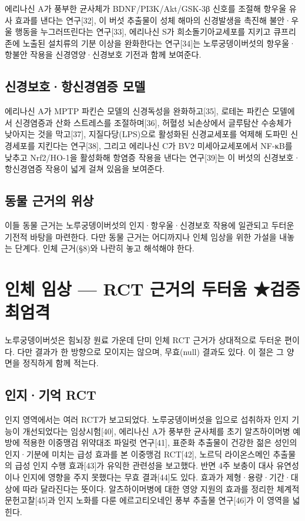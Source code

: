 \documentclass[12pt,oneside]{book}
\begin{document}
에리나신 A가 풍부한 균사체가 BDNF/PI3K/Akt/GSK-3β 신호를 조절해 항우울 유사 효과를 낸다는 연구[32], 이 버섯 추출물이 성체 해마의 신경발생을 촉진해 불안·우울 행동을 누그러뜨린다는 연구[33], 에리나신 S가 희소돌기아교세포를 지키고 큐프리존에 노출된 설치류의 기분 이상을 완화한다는 연구[34]는 노루궁뎅이버섯의 항우울·항불안 작용을 신경영양·신경보호 기전과 함께 보여준다.

\subsection{신경보호·항신경염증 모델}

에리나신 A가 MPTP 파킨슨 모델의 신경독성을 완화하고[35], 로테논 파킨슨 모델에서 신경염증과 산화 스트레스를 조절하며[36], 허혈성 뇌손상에서 글루탐산 수송체가 낮아지는 것을 막고[37], 지질다당(LPS)으로 활성화된 신경교세포를 억제해 도파민 신경세포를 지킨다는 연구[38], 그리고 에리나신 C가 BV2 미세아교세포에서 NF-κB를 낮추고 Nrf2/HO-1을 활성화해 항염증 작용을 낸다는 연구[39]는 이 버섯의 신경보호·항신경염증 작용이 넓게 걸쳐 있음을 보여준다.

\subsection{동물 근거의 위상}

이들 동물 근거는 노루궁뎅이버섯의 인지·항우울·신경보호 작용에 일관되고 두터운 기전적 바탕을 마련한다. 다만 동물 근거는 어디까지나 인체 임상을 위한 가설을 내놓는 단계다. 인체 근거(§8)와 나란히 놓고 해석해야 한다.

\section{인체 임상 — RCT 근거의 두터움 ★검증 최엄격}

노루궁뎅이버섯은 힘뇌장 원료 가운데 단미 인체 RCT 근거가 상대적으로 두터운 편이다. 다만 결과가 한 방향으로 모이지는 않으며, 무효(null) 결과도 있다. 이 절은 그 양면을 정직하게 함께 적는다.

\subsection{인지·기억 RCT}

인지 영역에서는 여러 RCT가 보고되었다. 노루궁뎅이버섯을 입으로 섭취하자 인지 기능이 개선되었다는 임상시험[40], 에리나신 A가 풍부한 균사체를 초기 알츠하이머병 예방에 적용한 이중맹검 위약대조 파일럿 연구[41], 표준화 추출물이 건강한 젊은 성인의 인지·기분에 미치는 급성 효과를 본 이중맹검 RCT[42], 노르딕 라이온스메인 추출물의 급성 인지 수행 효과[43]가 유익한 관련성을 보고했다. 반면 4주 보충이 대사 유연성이나 인지에 영향을 주지 못했다는 무효 결과[44]도 있다. 효과가 제형·용량·기간·대상에 따라 달라진다는 뜻이다. 알츠하이머병에 대한 영양 지원의 효과를 정리한 체계적 문헌고찰[45]과 인지 노화를 다룬 에르고티오네인 풍부 추출물 연구[46]가 이 영역을 넓힌다.
\end{document}

